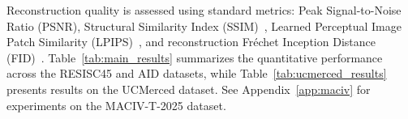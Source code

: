 \documentclass{article} %
\begin{document}
Reconstruction quality is assessed using standard metrics: Peak Signal-to-Noise Ratio (PSNR), Structural Similarity Index (SSIM)~\citep{wangImageQualityAssessment2004}, Learned Perceptual Image Patch Similarity (LPIPS)~\citep{zhangUnreasonableEffectivenessDeep2018}, and reconstruction Fréchet Inception Distance (FID)~\citep{heuselGANsTrainedTwo2017}. Table~\ref{tab:main_results} summarizes the quantitative performance across the RESISC45 and AID datasets, while Table~\ref{tab:ucmerced_results} presents results on the UCMerced dataset. See Appendix~\ref{app:maciv} for experiments on the MACIV-T-2025 dataset.

\end{document}
